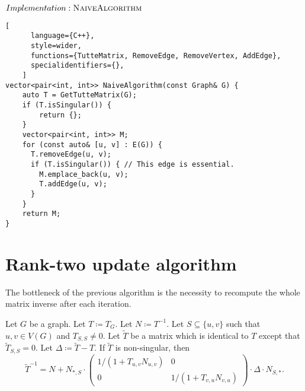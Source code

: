 \begin{programruledcaption}{\(Implementation: \textsc{NaiveAlgorithm}\)}
    \begin{lstlisting}[
      language={C++},
      style=wider,
      functions={TutteMatrix, RemoveEdge, RemoveVertex, AddEdge},
      specialidentifiers={},
    ]
vector<pair<int, int>> NaiveAlgorithm(const Graph& G) {
    auto T = GetTutteMatrix(G);
    if (T.isSingular()) {
        return {};
    }
    vector<pair<int, int>> M;
    for (const auto& [u, v] : E(G)) {
      T.removeEdge(u, v);
      if (T.isSingular()) { // This edge is essential.
        M.emplace_back(u, v); 
        T.addEdge(u, v);
      }
    }
    return M;
}
    \end{lstlisting}
\end{programruledcaption}

\section{Rank-two update algorithm}

The bottleneck of the previous algorithm is the necessity to recompute the whole matrix inverse after each iteration.

\begin{theorem}
\label{thm:rank-two}
    Let \(G\) be a graph. 
    Let \(T \coloneqq T_G\). 
    Let \(N \coloneqq T^{-1}\).
    Let \(S \subseteq \{u, v\}\) such that \(u, v \in V(G)\) and \(T_{S, S} \neq 0\).
    Let \(\tilde{T}\) be a matrix which is identical to \(T\) except that \(\tilde{T}_{S, S} = 0\).
    Let \(\Delta \coloneqq \tilde{T} - T\).
    If \(\tilde{T}\) is non-singular, then
    \[
        \tilde{T}^{-1} = N + N_{*, S} \cdot 
        \begin{pmatrix}
            1 / (1 + T_{u, v}N_{u, v}) & 0 \\
            0 &  1 / (1 + T_{v, u}N_{v, u})
        \end{pmatrix}
        \cdot \Delta \cdot N_{S, *}.
    \]
\end{theorem}


